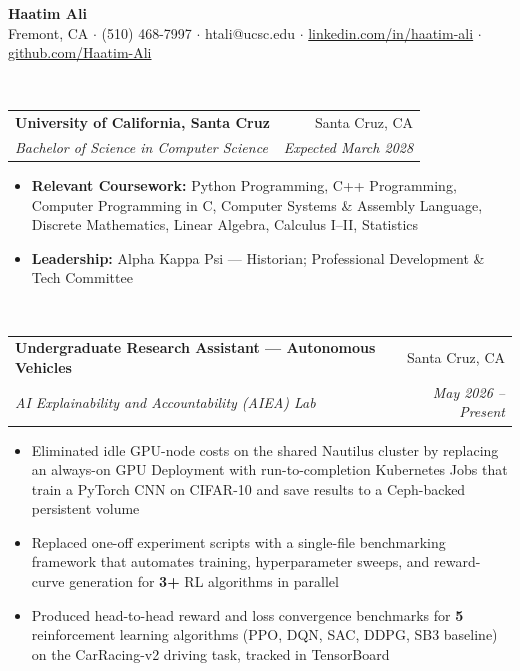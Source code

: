 \documentclass[letterpaper,10pt]{article}
\makeatletter
\newcommand{\resitem}[1]{\item #1 \vspace{-6pt}}
\newcommand{\resheading}[1]{\vspace{7pt}{\Large \textbf{#1}}\\\vspace{-8pt}\hrulefill}
\newcommand{\ressubheading}[4]{\vspace{2pt}
\begin{tabular*}{7.0in}{l@{\cftdotfill{\cftsecdotsep}\extracolsep{\fill}}r}
        \textbf{#1} & #2 \\
        \textit{#3} & \textit{#4} \\
\end{tabular*}\vspace{-6pt}}
\makeatother
\begin{document}
\begin{center}
{\huge \textbf{Haatim Ali}}\\[3pt]
Fremont, CA $\cdot$ (510) 468-7997 $\cdot$ htali@ucsc.edu $\cdot$ \href{https://www.linkedin.com/in/haatim-ali}{linkedin.com/in/haatim-ali} $\cdot$ \href{https://github.com/Haatim-Ali}{github.com/Haatim-Ali}
\end{center}
\vspace{-10pt}

\resheading{Education}

\ressubheading{University of California, Santa Cruz}{Santa Cruz, CA}{Bachelor of Science in Computer Science}{Expected March 2028}
\begin{itemize}
    \resitem{\textbf{Relevant Coursework:} Python Programming, C++ Programming, Computer Programming in C, Computer Systems \& Assembly Language, Discrete Mathematics, Linear Algebra, Calculus I--II, Statistics}
    \resitem{\textbf{Leadership:} Alpha Kappa Psi --- Historian; Professional Development \& Tech Committee}
\end{itemize}

\resheading{Experience}

\ressubheading{Undergraduate Research Assistant --- Autonomous Vehicles}{Santa Cruz, CA}{AI Explainability and Accountability (AIEA) Lab}{May 2026 -- Present}
\begin{itemize}
    \resitem{Eliminated idle GPU-node costs on the shared Nautilus cluster by replacing an always-on GPU Deployment with run-to-completion Kubernetes Jobs that train a PyTorch CNN on CIFAR-10 and save results to a Ceph-backed persistent volume}
    \resitem{Replaced one-off experiment scripts with a single-file benchmarking framework that automates training, hyperparameter sweeps, and reward-curve generation for \textbf{3+} RL algorithms in parallel}
    \resitem{Produced head-to-head reward and loss convergence benchmarks for \textbf{5} reinforcement learning algorithms (PPO, DQN, SAC, DDPG, SB3 baseline) on the CarRacing-v2 driving task, tracked in TensorBoard}
\end{itemize}
\end{document}
